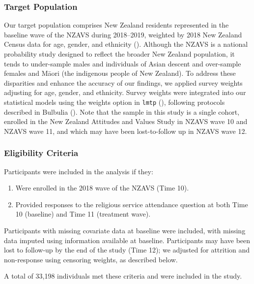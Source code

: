 \documentclass[
  single column]{article}
\providecommand{\tightlist}{%
  \setlength{\itemsep}{0pt}\setlength{\parskip}{0pt}}\usepackage{longtable,booktabs,array}
\begin{document}
\subsubsection{Target Population}\label{target-population}

Our target population comprises New Zealand residents represented in the
baseline wave of the NZAVS during 2018--2019, weighted by 2018 New
Zealand Census data for age, gender, and ethnicity
(). Although the NZAVS is a
national probability study designed to reflect the broader New Zealand
population, it tends to under-sample males and individuals of Asian
descent and over-sample females and Māori (the indigenous people of New
Zealand). To address these disparities and enhance the accuracy of our
findings, we applied survey weights adjusting for age, gender, and
ethnicity. Survey weights were integrated into our statistical models
using the weights option in \texttt{lmtp}
(), following
protocols described in Bulbulia
(). Note that the sample in
this study is a single cohort, enrolled in the New Zealand Attitudes and
Values Study in NZAVS wave 10 and NZAVS wave 11, and which may have been
lost-to-follow up in NZAVS wave 12.

\subsubsection{Eligibility Criteria}\label{eligibility-criteria}

Participants were included in the analysis if they:

\begin{enumerate}
\def\labelenumi{\arabic{enumi}.}
\tightlist
\item
  Were enrolled in the 2018 wave of the NZAVS (Time 10).
\item
  Provided responses to the religious service attendance question at
  both Time 10 (baseline) and Time 11 (treatment wave).
\end{enumerate}

Participants with missing covariate data at baseline were included, with
missing data imputed using information available at baseline.
Participants may have been lost to follow-up by the end of the study
(Time 12); we adjusted for attrition and non-response using censoring
weights, as described below.

A total of 33,198 individuals met these criteria and were included in
the study.
\end{document}
